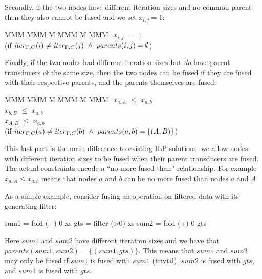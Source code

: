 Secondly, if the two nodes have different iteration sizes and no common parent then they also cannot be fused and we set $x_{i,j} = 1$:
\begin{tabbing}
MMM     \= MMM \= M \= MMM \= M \= MMM \= \kill
        \> $x_{i,j}$   \> $=$   \> $1$          \>       \>     \\
        \> (if $\mathit{iter}_{\Gamma,C}(i) \not= \mathit{iter}_{\Gamma,C}(j) 
                ~\wedge~ parents(i,j) = \emptyset$)
\end{tabbing}

Finally, if the two nodes had different iteration sizes but \emph{do} have parent transducers of the same size, then the two nodes can be fused if they are fused with their respective parents, and the parents themselves are fused:
\begin{tabbing}
MMM     \= MMM \= M \= MMM \= M \= MMM \= \kill
        \> $x_{a,A}$   \> $\le$ \> $x_{a,b}$    \>       \>     \\
        \> $x_{b,B}$   \> $\le$ \> $x_{a,b}$    \>       \>     \\
        \> $x_{A,B}$   \> $\le$ \> $x_{a,b}$    \>       \>     \\
        \> (if $\mathit{iter}_{\Gamma,C}(a) \not= \mathit{iter}_{\Gamma,C}(b) 
                ~\wedge~ parents(a,b) = \{(A,B)\}$)
\end{tabbing}

This last part is the main difference to existing ILP solutions: we allow nodes with different iteration sizes to be fused when their parent transducers are fused. The actual constraints encode a ``no more fused than'' relationship. For example $x_{a,A} \le x_{a,b}$ means that nodes $a$ and $b$ can be no more fused than nodes $a$ and $A$. 

As a simple example, consider fusing an operation on filtered data with its generating filter:
\begin{code}
    sum1 = fold (+) 0  xs
    gts  = filter (>0) xs
    sum2 = fold (+) 0  gts
\end{code}

Here $sum1$ and $sum2$ have different iteration sizes and we have that $parents(sum1, sum2) = \{(sum1, gts)\}$. This means that $sum1$ and $sum2$ may only be fused if $sum1$ is fused with $sum1$ (trivial), $sum2$ is fused with $gts$, and $sum1$ is fused with $gts$.


